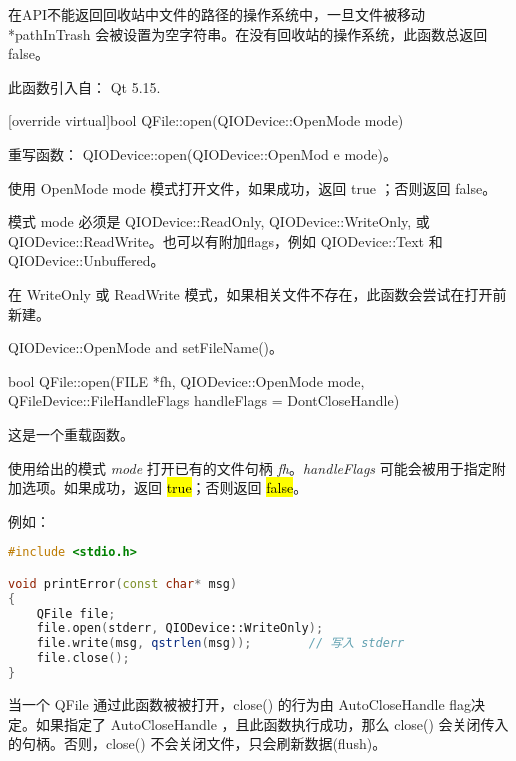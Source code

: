 \begin{notice}
在API不能返回回收站中文件的路径的操作系统中，一旦文件被移动 *pathInTrash 会被设置为空字符串。在没有回收站的操作系统，此函数总返回 false。
\end{notice} 

此函数引入自： Qt 5.15.

[override virtual]bool QFile::open(QIODevice::OpenMode mode)

重写函数： QIODevice::open(QIODevice::OpenMod
e mode)。

使用 OpenMode mode 模式打开文件，如果成功，返回 true ；否则返回 false。

模式 mode 必须是 QIODevice::ReadOnly, QIODevice::WriteOnly, 或 QIODevice::ReadWrite。也可以有附加flags，例如 QIODevice::Text 和 QIODevice::Unbuffered。

\begin{notice}
在 WriteOnly 或 ReadWrite 模式，如果相关文件不存在，此函数会尝试在打开前新建。
\end{notice} 



\begin{notice}[另请参阅]
QIODevice::OpenMode and setFileName()。
\end{notice} 



bool QFile::open(FILE *fh, QIODevice::OpenMode mode, QFileDevice::FileHandleFlags handleFlags = DontCloseHandle)

这是一个重载函数。

使用给出的模式 \emph{mode} 打开已有的文件句柄 \emph{fh}。\emph{handleFlags} 可能会被用于指定附加选项。如果成功，返回 \hl{true}；否则返回 \hl{false}。

例如：


\begin{lstlisting}[language=C++]
#include <stdio.h>

void printError(const char* msg)
{
    QFile file;
    file.open(stderr, QIODevice::WriteOnly);
    file.write(msg, qstrlen(msg));        // 写入 stderr
    file.close();
}
\end{lstlisting}

当一个 QFile 通过此函数被被打开，close() 的行为由 AutoCloseHandle flag决定。如果指定了 AutoCloseHandle ，且此函数执行成功，那么 close() 会关闭传入的句柄。否则，close() 不会关闭文件，只会刷新数据(flush)。

\begin{notice}[警告]

\end{notice} 

